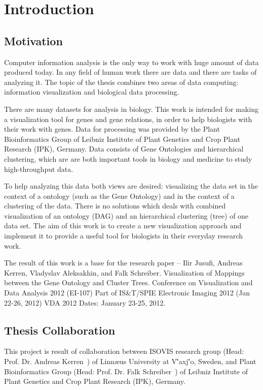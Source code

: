 \section{Introduction}
\label{sec:introduction}

\subsection{Motivation}
\label{sec:motivation}

Computer information analysis is the only way to work with huge amount of data produced today. In any field of human work there are data and there are tasks of analyzing it. The topic of the thesis combines two areas of data computing: information visualization and biological data processing.

There are many datasets for analysis in biology. This work is intended for making a visualization tool for genes and gene relations, in order to help biologists with their work with genes. Data for processing was provided by the Plant Bioinformatics Group of Leibniz Institute of Plant Genetics and Crop Plant Research (IPK), Germany. Data consists of Gene Ontologies and hierarchical clustering, which are are both important tools in biology and medicine to study high-throughput data.

To help analyzing this data both views are desired: visualizing the data set in the context of a ontology (such as the Gene Ontology) and in the context of a clustering of the data. There is no solutions which deals with combined visualization of an ontology (DAG) and an hierarchical clustering (tree) of one data set. The aim of this work is to create a new visualization approach and implement it to provide a useful tool for biologists in their everyday research work.

The result of this work is a base for the research paper -- \textsf{Ilir Jusufi, Andreas Kerren, Vladyslav Aleksakhin, and Falk Schreiber. Visualization of Mappings between the Gene Ontology and Cluster Trees. Conference on Visualization and Data Analysis 2012 (EI-107) Part of IS&T/SPIE Electronic Imaging 2012 (Jan 22-26, 2012) VDA 2012 Dates: January 23-25, 2012.}

\subsection{Thesis Collaboration}
This project is result of collaboration between ISOVIS research group (Head: Prof. Dr. Andreas Kerren~\cite{Kerren}) of Linn\ae us University at V\''axj\''o, Sweden, and Plant Bioinformatics Group (Head: Prof. Dr. Falk Schreiber~\cite{Schreiber}) of Leibniz Institute of Plant Genetics and Crop Plant Research (IPK), Germany.


